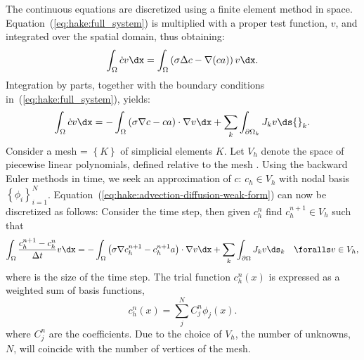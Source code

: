 The continuous equations are discretized using a finite element method
in space. Equation~(\ref{eq:hake:full_system}) is multiplied with a proper
test function, $v$, and integrated over the spatial domain, thus
obtaining:
\begin{equation}
  \label{eq:hake:advection-diffusion-weak-form-0}
  \int_\Omega\dot{c}v \dx = \int_\Omega \left(\sigma\Delta c-\nabla(ca)\right) v \dx.
\end{equation}
Integration by parts, together with the boundary conditions
in~(\ref{eq:hake:full_system}), yields:
\begin{equation}
  \label{eq:hake:advection-diffusion-weak-form}
  \int_\Omega\dot{c}v \dx = -\int_\Omega \left(\sigma\nabla c-ca\right)\cdot\nabla v \dx + \sum_k\int_{\partial\Omega_k} J_kv \ds{}_k.
\end{equation}
Consider a mesh \T = $\left\{K\right\}$ of simplicial elements
$K$. Let $V_h$ denote the space of piecewise linear polynomials,
defined relative to the mesh \T. Using the backward Euler methods in
time, we seek an approximation of $c$: $c_h\in V_h$ with nodal basis
$\left\{\phi_i\right\}^N_{i=1}$. Equation~(\ref{eq:hake:advection-diffusion-weak-form})
can now be discretized as follows: Consider the \nth time step, then
given $c_h^n$ find $c_h^{n+1} \in V_h$ such that
\begin{equation}
  \label{eq:hake:advection-diffusion-weak-discrete-form}
  \int_{\Omega} \frac{c_h^{n+1}-c_h^{n}}{\Dt}v \dx = -\int_{\Omega} \left(\sigma\nabla c_h^{n+1}-c_h^{n+1}a\right)\cdot\nabla v \dx + \sum_k\int_{\partial\Omega} J_kv\ds_{k}\quad\foralls v \in V_h,
\end{equation}
where \Dt is the size of the time step. The trial function $c^n_h(x)$
is expressed as a weighted sum of basis functions,
\begin{equation}
  \label{eq:hake:discrete-solution}
  c^n_h(x) = \sum^N_j C_j^n\phi_j(x).
\end{equation}
where $C_j^n$ are the coefficients. Due to the choice of $V_h$, the
number of unknowns, $N$, will coincide with the number of vertices of
the mesh.

